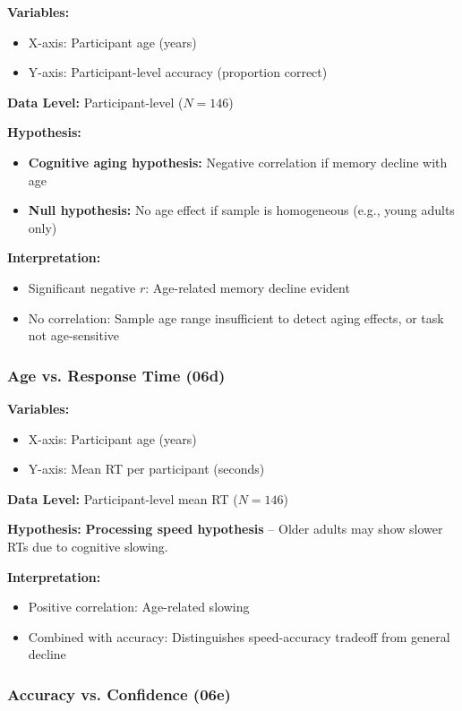 \documentclass[12pt,a4paper]{article}
\begin{document}
\textbf{Variables:}
\begin{itemize}
    \item X-axis: Participant age (years)
    \item Y-axis: Participant-level accuracy (proportion correct)
\end{itemize}

\textbf{Data Level:} Participant-level ($N=146$)

\textbf{Hypothesis:} 
\begin{itemize}
    \item \textbf{Cognitive aging hypothesis:} Negative correlation if memory decline with age
    \item \textbf{Null hypothesis:} No age effect if sample is homogeneous (e.g., young adults only)
\end{itemize}

\textbf{Interpretation:}
\begin{itemize}
    \item Significant negative $r$: Age-related memory decline evident
    \item No correlation: Sample age range insufficient to detect aging effects, or task not age-sensitive
\end{itemize}

\subsubsection{Age vs. Response Time (06d)}

\textbf{Variables:}
\begin{itemize}
    \item X-axis: Participant age (years)
    \item Y-axis: Mean RT per participant (seconds)
\end{itemize}

\textbf{Data Level:} Participant-level mean RT ($N=146$)

\textbf{Hypothesis:} \textbf{Processing speed hypothesis} -- Older adults may show slower RTs due to cognitive slowing.

\textbf{Interpretation:}
\begin{itemize}
    \item Positive correlation: Age-related slowing
    \item Combined with accuracy: Distinguishes speed-accuracy tradeoff from general decline
\end{itemize}

\subsubsection{Accuracy vs. Confidence (06e)}
\end{document}
